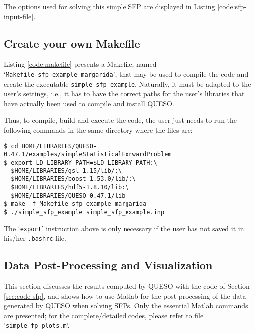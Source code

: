 The options used for solving this simple SFP are displayed in Listing \ref{code:sfp-input-file}.






\subsection{Create your own Makefile}\label{sec:sfp-makefile}

 
Listing \ref{code:makefile} presents a Makefile, named `\texttt{Makefile\_sfp\_example\_margarida}', that may be used to compile the code and create the executable \verb+simple_sfp_example+. Naturally, it must be adapted to the user's settings, i.e., it has to have the correct paths for the user's libraries that have actually been used to compile and install QUESO.



Thus, to compile, build and execute the code, the user just needs to run the following commands in the same directory where the files are:
\begin{lstlisting}
$ cd HOME/LIBRARIES/QUESO-0.47.1/examples/simpleStatisticalForwardProblem 
$ export LD_LIBRARY_PATH=$LD_LIBRARY_PATH:\
  $HOME/LIBRARIES/gsl-1.15/lib/:\
  $HOME/LIBRARIES/boost-1.53.0/lib/:\
  $HOME/LIBRARIES/hdf5-1.8.10/lib:\
  $HOME/LIBRARIES/QUESO-0.47.1/lib 
$ make -f Makefile_sfp_example_margarida 
$ ./simple_sfp_example simple_sfp_example.inp
\end{lstlisting}

The `\verb+export+' instruction above is only necessary if the user has not saved it in his/her \verb+.bashrc+ file. 


\subsection{Data Post-Processing and Visualization}\label{sec:sfp-results}

This section discusses the results computed by QUESO with the code of Section \ref{sec:code-sfp}, and shows how to use Matlab for the post-processing of the data generated by QUESO when solving SFPs. Only the essential Matlab commands are presented; for the complete/detailed codes, please refer to file '\verb+simple_fp_plots.m+'.

